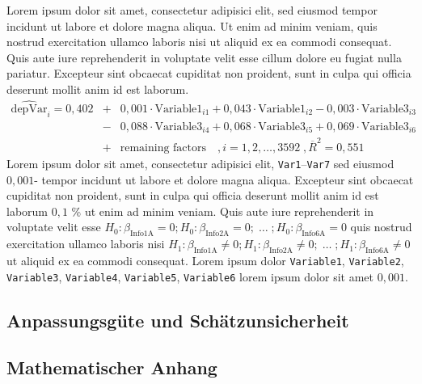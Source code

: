Lorem ipsum dolor sit amet, consectetur adipisici elit, sed eiusmod tempor incidunt ut labore et dolore magna aliqua. Ut enim ad minim veniam, quis nostrud exercitation ullamco laboris nisi ut aliquid ex ea commodi consequat. Quis aute iure reprehenderit in voluptate velit esse cillum dolore eu fugiat nulla pariatur. Excepteur sint obcaecat cupiditat non proident, sunt in culpa qui officia deserunt mollit anim id est laborum.
%
\begin{eqnarray}
\widehat{\text{depVar}}_i  = 0{,}402 &+& 0{,}001\cdot\text{Variable1}_{i1}+ 0{,}043\cdot\text{Variable1}_{i2}  -0{,}003 \cdot \text{Variable3}_{i3} \nonumber\\\nonumber
&-& 0{,}088 \cdot  \text{Variable3}_{i4}+ 0{,}068 \cdot  \text{Variable3}_{i5} + 0{,}069 \cdot \text{Variable3}_{i6}\\\nonumber
 &+& \text{remaining factors} \quad, i=1,2,\ldots , 3592 \; , \overline{R}^2=0{,}551\nonumber
\end{eqnarray}
%
Lorem ipsum dolor sit amet, consectetur adipisici elit, \texttt{Var1}--\texttt{Var7}  sed eiusmod $0{,}001$- tempor incidunt ut labore et dolore magna aliqua. Excepteur sint obcaecat cupiditat non proident, sunt in culpa qui officia deserunt mollit anim id est laborum $0{,}1$ \% ut enim ad minim veniam. Quis aute iure reprehenderit in voluptate velit esse $H_0:\beta_\text{Info1A}=0; H_0:\beta_\text{Info2A}=0; \;\ldots \; ; H_0:\beta_\text{Info6A}=0$ quis nostrud exercitation ullamco laboris nisi $H_1:\beta_\text{Info1A}\ne 0; H_1:\beta_\text{Info2A}\ne 0; \;\ldots \; ; H_1:\beta_\text{Info6A}\ne 0$ ut aliquid ex ea commodi consequat. Lorem ipsum dolor \texttt{Variable1}, \texttt{Variable2}, \texttt{Variable3}, \texttt{Variable4}, \texttt{Variable5}, \texttt{Variable6} lorem ipsum dolor sit amet $0{,}001$.\\ 

\subsection{Anpassungsgüte und Schätzunsicherheit}


%
\subsection{Mathematischer Anhang}

